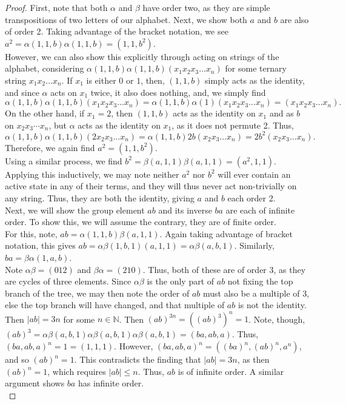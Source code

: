 \documentclass[11pt]{amsart}
\theoremstyle{definition}
\theoremstyle{remark}
\numberwithin{equation}{section}
\begin{document}
\begin{proof} 
\indent First, note that both $\alpha$ and $\beta$ have order two, as they are simple transpositions of two letters of our alphabet. Next, we show both $a$ and $b$ are also of order 2. Taking advantage of the bracket notation, we see $a^2 = \alpha(1, 1, b)\alpha(1, 1, b)=(1,1,b^2).$\\
\indent However, we can also show this explicitly through acting on strings of the alphabet, considering $\alpha(1, 1, b)\alpha(1, 1, b)(x_1 x_2 x_3 \ldots  x_n)$ for some ternary string $x_1x_2\ldots x_n$. If $x_1$ is either $0$ or $1$, then, $(1,1,b)$ simply acts as the identity, and since $\alpha$ acts on $x_1$ twice, it also does nothing, and, we simply find $$\alpha(1, 1, b)\alpha(1, 1, b)(x_1 x_2 x_3 \ldots x_n) = \alpha(1, 1, b)\alpha (1) (x_1 x_2 x_3 ... x_n) = (x_1 x_2 x_3 ... x_n).$$ 
\indent On the other hand, if $x_1 = 2$, then $(1,1,b)$ acts as the identity on $x_1$ and as $b$ on $x_2x_3\cdots x_n$, but $\alpha$ acts as the identity on $x_1$, as it does not permute 2. Thus, $$\alpha(1, 1, b)\alpha(1, 1, b)(2 x_2 x_3 \ldots x_n) = \alpha(1, 1, b)2 b (x_2 x_3 \ldots  x_n) = 2 b^2(x_2 x_3 \ldots  x_n).$$ Therefore, we again find $a^2 = (1,1,b^2)$.\\
\indent Using a similar process, we find $b^2 = \beta(a, 1, 1)\beta(a, 1, 1) = (a^2, 1, 1)$. Applying this inductively, we may note neither $a^2$ nor $b^2$ will ever contain an active state in any of their terms, and they will thus never act non-trivially on any string. Thus, they are both the identity, giving $a$ and $b$ each order 2.\\

\indent Next, we will show the group element $ab$ and its inverse $ba$ are each of infinite order. To show this, we will assume the contrary, they are of finite order.\\
\indent For this, note, $ab = \alpha(1, 1, b)\beta(a, 1, 1)$. Again taking advantage of bracket notation, this gives $ab=\alpha\beta(1,b,1)(a,1,1)=\alpha\beta(a,b,1)$. Similarly, $ba=\beta\alpha(1,a,b)$.\\ 
\indent Note $\alpha\beta=(012)$ and $\beta\alpha=(210)$. Thus, both of these are of order 3, as they are cycles of three elements. Since $\alpha\beta$ is the only part of $ab$ not fixing the top branch of the tree, we may then note the order of $ab$ must also be a multiple of 3, else the top branch will have changed, and that multiple of $ab$ is not the identity.\\
\indent Then $|ab|=3n$ for some $n\in \mathbb{N}$. Then $(ab)^{3n}=((ab)^3)^n=1$. Note, though, $(ab)^3=\alpha\beta(a,b,1)\alpha\beta(a,b,1)\alpha\beta(a,b,1)=(ba,ab,a)$. Thus, $(ba,ab,a)^n=1=(1,1,1)$. However, $(ba,ab,a)^n=((ba)^n,(ab)^n,a^n)$, and so $(ab)^n=1$. This contradicts the finding that $|ab|=3n$, as then $(ab)^n=1$, which requires $|ab|\leq n$. Thus, $ab$ is of infinite order. A similar argument shows $ba$ has infinite order.\\


\end{proof}
\end{document}

